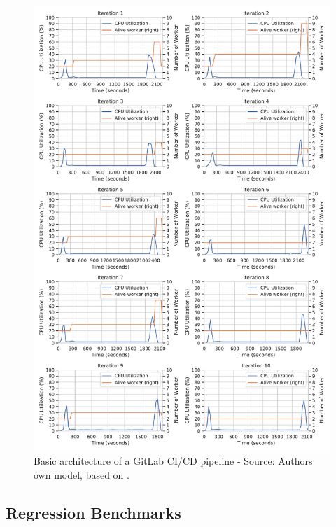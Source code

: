 \begin{figure}[h]
\centering
\includegraphics[scale=0.4]{images/07_evaluation/mortgage/mortgage_auto-scaler_performance}
\caption{Basic architecture of a GitLab CI/CD pipeline - Source: Authors own model, based on \cite{Gitlab2020Docs}.}
\label{fig:07_mortgage_static-cpu_results}
\end{figure}


\subsection{Regression Benchmarks}
\label{sec:appendix_eval_regression}

